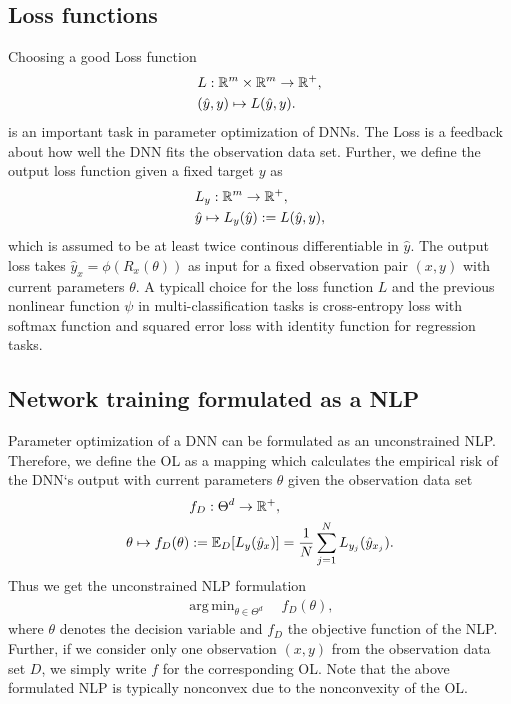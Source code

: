 \documentclass[conference]{IEEEtran}
\DeclareMathOperator*{\argmin}{arg\,min}
\begin{document}
	\subsection{Loss functions}
	\noindent
	Choosing a good 
	Loss function
	\begin{align}
	&L:\mathbb{R}^{m}\times \mathbb{R}^{m}\rightarrow \mathbb{R}^{+}, \notag\\
	&(\hat{y}, y)\mapsto L(\hat{y}, y).
	\end{align}
	is an important task in parameter optimization of DNNs. The Loss is a feedback about how well the DNN fits the observation data set. Further, we define the output loss function given a fixed target $y$ as
	\begin{align}
	&L_{y}:\mathbb{R}^{m}\rightarrow \mathbb{R}^{+}, \notag\\
	&\hat{y}\mapsto L_{y}(\hat{y}) := L(\hat{y}, y),
	\end{align}
	which is assumed to be at least twice continous differentiable in $\hat{y}$. The output loss takes $\hat{y}_{x} = \phi(R_{x}(\theta))$ as input for a fixed observation pair $(x, y)$ with current parameters $\theta$. 
	A typicall choice for the loss function $L$ and the previous nonlinear function $\psi$ in multi-classification tasks is cross-entropy loss with softmax function and squared error loss with identity function for regression tasks.



	\subsection{Network training formulated as a NLP}
	\noindent
	Parameter optimization of a DNN can be formulated as an unconstrained NLP. Therefore, we define the OL as a mapping which calculates the empirical risk of the DNN`s output with current parameters $\theta$ given the observation data set
	\begin{align}
	&f_{D}:\Theta^{d}\rightarrow\mathbb{R}^{+}, \notag\\
	\theta\mapsto f_{D}(\theta) &:= \mathbb{E}_{D}[L_{y}(\hat{y}_{x})] =  \frac{1}{N}\sum_{j = 1}^{N}L_{y_{j}}(\hat{y}_{x_{j}}).
	\end{align}
	Thus we get the unconstrained NLP formulation
	\begin{align}
	\argmin_{\theta\in\Theta^{d}}\quad f_{D}(\theta),
	\end{align}
	where $\theta$ denotes the decision variable and $f_{D}$ the objective function of the NLP.
	Further, if we consider only one observation $(x, y)$ from the observation data set $D$, we simply write  $f$ for the corresponding OL. Note that the above formulated NLP 
	is typically nonconvex due to the nonconvexity of the OL.
\end{document}
